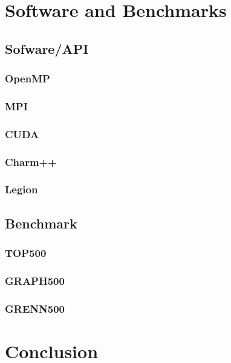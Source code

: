 \chapter{Software and Benchmarks}

\section{Sofware/API}
\subsection{OpenMP}
\subsection{MPI}
\subsection{CUDA}
\subsection{Charm++}
\subsection{Legion}
\section{Benchmark}
\subsection{TOP500}
\subsection{GRAPH500}
\subsection{GRENN500}

\chapter*{Conclusion}
